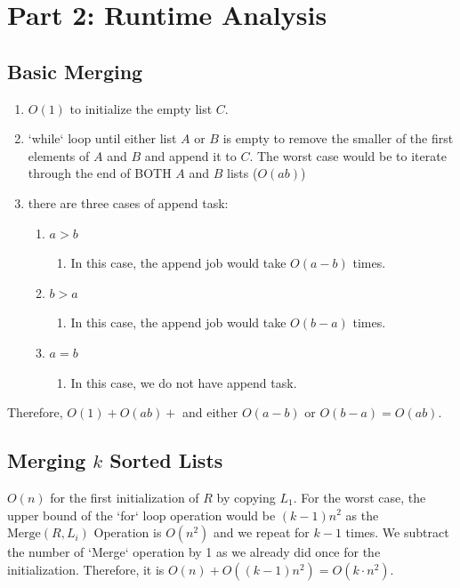 \documentclass[11pt]{article}
\begin{document}
\section{Part 2: Runtime Analysis}
\subsection{Basic Merging}
\begin{enumerate}[label=\arabic*.]
\item $O(1)$ to initialize the empty list $C$.
\item`while` loop until either list $A$ or $B$ is empty to remove the smaller of the first elements of $A$ and $B$ and append it to $C$. The worst case would be to iterate through the end of BOTH $A$ and $B$ lists ($O(ab)$)
\item there are three cases of append task:
    \begin{enumerate}[label=\arabic*.]
    \item $a>b$
    \begin{enumerate}[label=\arabic*.]
        \item In this case, the append job would take $O(a-b)$ times.
    \end{enumerate}
    \item $b>a$
    \begin{enumerate}[label=\arabic*.]
        \item In this case, the append job would take $O(b-a)$ times.
    \end{enumerate}
    \item $a=b$
    \begin{enumerate}[label=\arabic*.]
        \item In this case, we do not have append task.
    \end{enumerate}
\end{enumerate}
\end{enumerate}
Therefore, $O(1) + O(ab) +$ and either $O(a-b)$ or $O(b-a) = O(ab)$.

\subsection{Merging $k$ Sorted Lists}
$O(n)$ for the first initialization of $R$ by copying $L_1$.
For the worst case, the upper bound of the `for` loop operation would be $(k-1)n^2$ as the $\text{Merge}(R,L_i)$ Operation is $O(n^2)$ and we repeat for $k-1$ times. We subtract the number of `Merge` operation by 1 as we already did once for the initialization.
Therefore, it is $O(n) + O((k-1)n^2) = O(k \cdot n^2)$.
\end{document}
